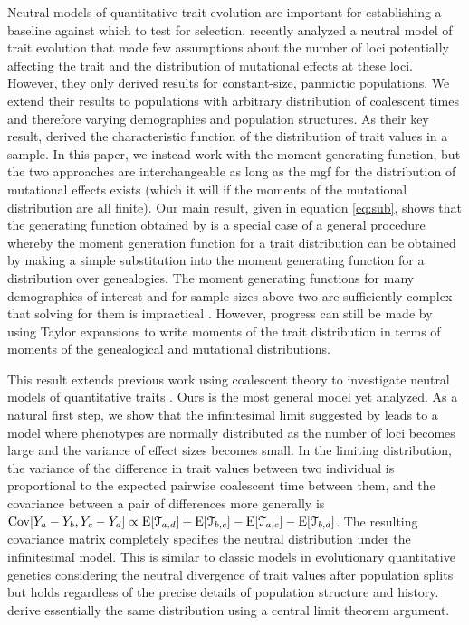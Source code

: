 Neutral models of quantitative trait evolution are important for establishing a
baseline against which to test for selection. \citet{Schraiber2015} recently
analyzed a neutral model of trait evolution that made few assumptions about the
number of loci potentially affecting the trait and the distribution of
mutational effects at these loci. However, they only derived results for
constant-size, panmictic populations. We extend their results to populations
with arbitrary distribution of coalescent times and therefore varying
demographies and population structures. As their key result,
\citet{Schraiber2015} derived the characteristic function of the distribution of
trait values in a sample. In this paper, we instead work with the moment
generating function, but the two approaches are interchangeable as long as the
mgf for the distribution of mutational effects exists (which it will if the
moments of the mutational distribution are all finite). Our main result, given
in equation \eqref{eq:sub}, shows that the generating function obtained
by \citet{Schraiber2015} is a special case of a general procedure whereby the
moment generation function for a trait distribution can be obtained by making a
simple substitution into the moment generating function for a distribution over
genealogies. The moment generating functions for many demographies of interest
and for sample sizes above two are sufficiently complex that solving for them is
impractical \citep{Lohse2011}. However, progress can still be made by using
Taylor expansions to write moments of the trait distribution in terms of moments
of the genealogical and mutational distributions.

This result extends previous work using coalescent theory to investigate neutral
models of quantitative traits \citep{Whitlock1999,Schraiber2015}. Ours is the
most general model yet analyzed. As a natural first step, we show that the
infinitesimal limit suggested by \citet{Fisher1918} leads to a model where
phenotypes are normally distributed as the number of loci becomes large and the
variance of effect sizes becomes small. In the limiting distribution, the
variance of the difference in trait values between two individual is
proportional to the expected pairwise coalescent time between them, and the
covariance between a pair of differences more generally is $\mathrm{Cov}[Y_a - Y_b,Y_c -
Y_d] \propto \mathrm{E}[\mathcal{T}_{a,d}] + \mathrm{E}[\mathcal{T}_{b,c}] -
\mathrm{E}[\mathcal{T}_{a,c}] - \mathrm{E}[\mathcal{T}_{b,d}]$. The resulting covariance matrix
completely specifies the neutral distribution under the infinitesimal model.
This is similar to classic models in evolutionary quantitative genetics
considering the neutral divergence of trait values after population splits
\citep{Lande1976,Lynch1989} but holds regardless of the precise details of
population structure and history. \citet{Schraiber2015} derive essentially the
same distribution using a central limit theorem argument. 

